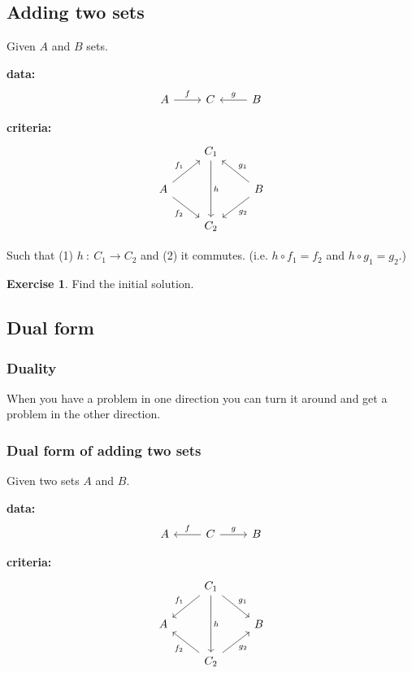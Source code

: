 \documentclass[a4paper, 12pt]{article}
\theoremstyle{definition}
\newtheorem{exercise}{Exercise}
\begin{document}
\subsection{Adding two sets}

Given $A$ and $B$ sets.

\textbf{data:}
$$
\begin{tikzcd}
    A \arrow[r, "f"] & C & B \arrow[l, swap, "g"]
\end{tikzcd}
$$

\textbf{criteria:}
$$
\begin{tikzcd}
    {} & C_1 \arrow[dd, "h"] & {} \\
    A \arrow[ru, "f_1"] \arrow[rd, swap, "f_2"]
    & {}
    &
    B \arrow[lu, swap, "g_1"] \arrow[ld, "g_2"]
    \\
    {} & C_2 & {}
\end{tikzcd}
$$

Such that (1) $h\ :\ C_1 \rightarrow C_2$ and (2) it commutes. (i.e. $h \circ f_1 = f_2$
and $h \circ g_1 = g_2$.)

\begin{exercise}
    Find the initial solution.
\end{exercise}

\subsection{Dual form}

\subsubsection*{Duality}
When you have a problem in one direction you can turn it around and get a
problem in the other direction.

\subsubsection*{Dual form of adding two sets}

Given two sets $A$ and $B$.

\textbf{data:}
$$
\begin{tikzcd}
    A & C \arrow[l, swap, "f"] \arrow[r, "g"] & B
\end{tikzcd}
$$

\textbf{criteria:}
$$
\begin{tikzcd}
    {} & C_1 \arrow[dd, "h"] \arrow[ld, swap, "f_1"] \arrow[rd, "g_1"] & {} \\
    A & {} & B \\
    {} & C_2 \arrow[lu, "f_2"] \arrow[ru, swap, "g_2"] & {}
\end{tikzcd}
$$
\end{document}
